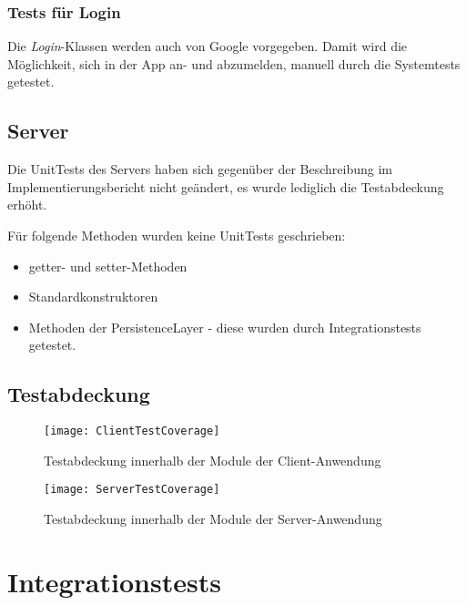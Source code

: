 \documentclass[11pt,a4paper]{scrartcl}
\begin{document}
\subsubsection{Tests für Login}
Die \textit{Login}-Klassen werden auch von Google vorgegeben. Damit wird die Möglichkeit, sich in der App an- und abzumelden, manuell durch die Systemtests getestet.


\newpage

\subsection{Server}

Die UnitTests des Servers haben sich gegenüber der Beschreibung im Implementierungsbericht nicht geändert, es wurde lediglich die Testabdeckung erhöht.

Für folgende Methoden wurden keine UnitTests geschrieben:
\begin{itemize}
	\item getter- und setter-Methoden
	\item Standardkonstruktoren
	\item Methoden der PersistenceLayer - diese wurden durch Integrationstests getestet.
\end{itemize}

\subsection{Testabdeckung}
\begin{center}
	\begin{figure}[H]
		\texttt{[image: ClientTestCoverage]}
		\caption{Testabdeckung innerhalb der Module der Client-Anwendung}
	\end{figure}
	
\end{center}

\begin{center}
	\begin{figure}[H]
		\texttt{[image: ServerTestCoverage]}
		\caption{Testabdeckung innerhalb der Module der Server-Anwendung}
	\end{figure}
	
\end{center}

\newpage

\section{Integrationstests}
\end{document}

